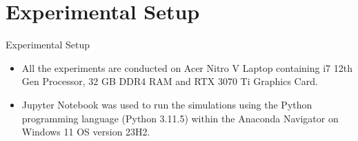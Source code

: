\documentclass[xcolor=dvipsnames,aspectratio=169]{beamer}
\begin{document}
\section{Experimental Setup}
\begin{frame}{Experimental Setup}
\begin{itemize}
    \item All the experiments are conducted on Acer Nitro V Laptop containing i7 12th Gen Processor, 32 GB DDR4 RAM and RTX 3070 Ti Graphics Card. 
    \item Jupyter Notebook was used to run the simulations using the Python programming language (Python 3.11.5) within the Anaconda Navigator on Windows 11 OS version 23H2.
\end{itemize}
    
\end{frame}



\end{document}
